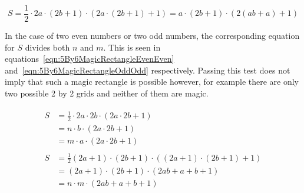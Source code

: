 \begin{equation}
	S = \frac{1}{2} \cdot 2a \cdot (2b + 1) \cdot (2a \cdot (2b + 1) + 1) = a \cdot (2b + 1) \cdot (2(ab + a) + 1)
	\label{eqn:5By6MagicRectangleEvenOdd}
\end{equation}

In the case of two even numbers or two odd numbers, the corresponding equation for $S$ divides both $n$ and $m$. This is seen in equations~\eqref{eqn:5By6MagicRectangleEvenEven} and~\eqref{eqn:5By6MagicRectangleOddOdd} respectively. Passing this test does not imply that such a magic rectangle is possible however, for example there are only two possible 2 by 2 grids and neither of them are magic.

\begin{subequations}
	\begin{align}
		\begin{split}
			S &= \frac{1}{2} \cdot 2a \cdot 2b \cdot (2a \cdot 2b + 1)  \\
			&= n \cdot b \cdot (2a \cdot 2b + 1)  \\
			&= m \cdot a \cdot (2a \cdot 2b + 1)
			\label{eqn:5By6MagicRectangleEvenEven}
		\end{split}\\		
		\begin{split}
			S &= \frac{1}{2} (2a + 1) \cdot (2b + 1) \cdot ((2a + 1) \cdot (2b + 1) + 1)  \\
			&= (2a + 1) \cdot (2b + 1) \cdot (2ab + a + b + 1)  \\
			&= n \cdot m \cdot (2ab + a + b + 1)
			\label{eqn:5By6MagicRectangleOddOdd}
		\end{split}
	\end{align}
\end{subequations}









